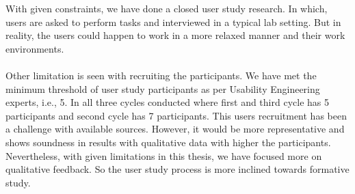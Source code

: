 With given constraints, we have done a closed user study research. In which, users are asked to perform tasks and interviewed in a typical lab setting. But in reality, the users could happen to work in a more relaxed manner and their work environments. \\ \\

Other limitation is seen with recruiting the participants. We have met the minimum threshold of user study participants as per Usability Engineering experts, i.e., 5. \cite{five} In all three cycles conducted where first and third cycle has 5 participants and second cycle has 7 participants. This users recruitment has been a challenge with available sources. However, it would be more representative and shows soundness in results with qualitative data with higher the participants. Nevertheless, with given limitations in this thesis, we have focused more on qualitative feedback. So the user study process is more inclined towards formative study. \\ \\